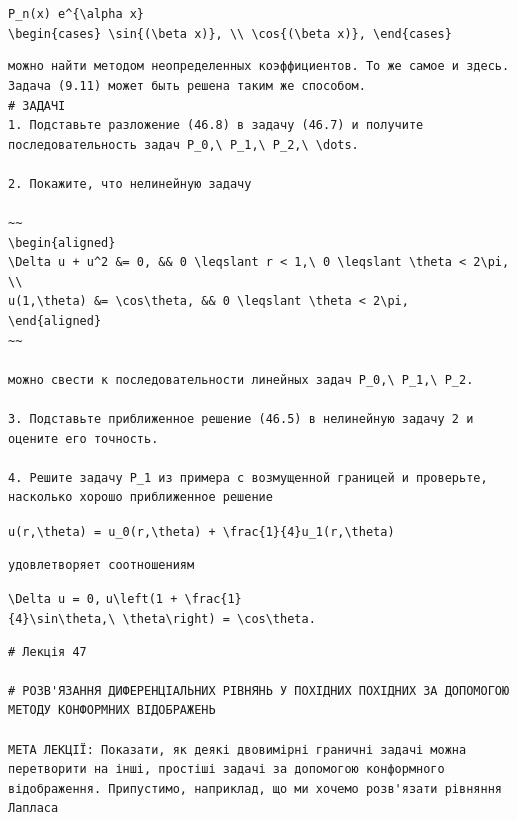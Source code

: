 \documentclass[
  ukrainian,
]{article}
\begin{document}
\texttt{P\_n(x)\ e\^{}\{\textbackslash{}alpha\ x\}}
\texttt{\textbackslash{}begin\{cases\}\ \textbackslash{}sin\{(\textbackslash{}beta\ x)\},\ \textbackslash{}\textbackslash{}\ \textbackslash{}cos\{(\textbackslash{}beta\ x)\},\ \textbackslash{}end\{cases\}}

\begin{verbatim}
можно найти методом неопределенных коэффициентов. То же самое и здесь. Задача (9.11) может быть решена таким же способом.
# ЗАДАЧІ
1. Подставьте разложение (46.8) в задачу (46.7) и получите последовательность задач P_0,\ P_1,\ P_2,\ \dots.

2. Покажите, что нелинейную задачу

~~
\begin{aligned}
\Delta u + u^2 &= 0, && 0 \leqslant r < 1,\ 0 \leqslant \theta < 2\pi, \\
u(1,\theta) &= \cos\theta, && 0 \leqslant \theta < 2\pi,
\end{aligned}
~~

можно свести к последовательности линейных задач P_0,\ P_1,\ P_2.

3. Подставьте приближенное решение (46.5) в нелинейную задачу 2 и оцените его точность.

4. Решите задачу P_1 из примера с возмущенной границей и проверьте, насколько хорошо приближенное решение
\end{verbatim}

\texttt{u(r,\textbackslash{}theta)\ =\ u\_0(r,\textbackslash{}theta)\ +\ \textbackslash{}frac\{1\}\{4\}u\_1(r,\textbackslash{}theta)}

\begin{verbatim}
удовлетворяет соотношениям
\end{verbatim}

\texttt{\textbackslash{}Delta\ u\ =\ 0,}
\texttt{u\textbackslash{}left(1\ +\ \textbackslash{}frac\{1\}\{4\}\textbackslash{}sin\textbackslash{}theta,\textbackslash{}\ \textbackslash{}theta\textbackslash{}right)\ =\ \textbackslash{}cos\textbackslash{}theta.}

\begin{verbatim}
# Лекція 47

# РОЗВ'ЯЗАННЯ ДИФЕРЕНЦІАЛЬНИХ РІВНЯНЬ У ПОХІДНИХ ПОХІДНИХ ЗА ДОПОМОГОЮ МЕТОДУ КОНФОРМНИХ ВІДОБРАЖЕНЬ

МЕТА ЛЕКЦІЇ: Показати, як деякі двовимірні граничні задачі можна перетворити на інші, простіші задачі за допомогою конформного відображення. Припустимо, наприклад, що ми хочемо розв'язати рівняння Лапласа
\end{verbatim}
\end{document}
